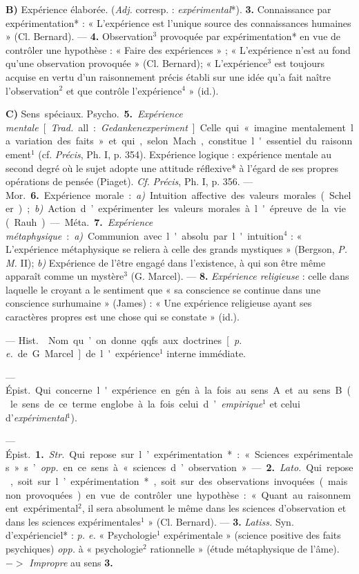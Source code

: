 \begin{itemize}[leftmargin=1cm, label=, itemsep=1pt]
{\bf B)}  Expérience élaborée. ({\it Adj.}
corresp. : {\it expérimental}*). {\bf 3.}  Connaissance par
expérimentation* : « L'expérience est l'unique source
des connaissances humaines » (Cl. Bernard). — {\bf 4.} 
Observation$^3$ provoquée par expérimentation* en vue de contrôler une
hypothèse : « Faire des expériences » ; « L’expérience n’est au fond
qu’une observation provoquée » (Cl. Bernard);
« L'expérience$^3$ est toujours acquise en vertu d'un
raisonnement précis établi sur une idée qu’a fait naître
l'observation$^2$ et que contrôle l’expérience$^4$ » (id.).

{\bf C)} \si{Sens spéciaux}.  \si{Psycho.}
 {\bf 5.} {\it Expérience mentale} [{\it Trad.} all. :
{\it Gedankenexperiment}]. Celle qui
« imagine mentalement la variation
des faits » et qui, selon Mach, constitue l'essentiel du raisonnement$^1$
(cf.  {\it Précis}, Ph. I, p. 354). Expérience logique : expérience mentale
au second degré où le sujet adopte une attitude réflexive* à l'égard de
ses propres opérations de pensée (Piaget). {\it Cf.}  {\it Précis}, Ph. I,
p. 356. — \si{Mor.} {\bf 6.} Expérience morale : {\it a)} Intuition
affective des valeurs morales (Scheler); {\it b)} Action d’expérimenter
les valeurs morales à l'épreuve de la vie (Rauh). — \si{Méta.} {\bf 7.}
{\it Expérience métaphysique} : {\it a)} Communion
avec l'absolu par l'intuition$^4$ : « L'expérience métaphysique se
reliera à celle des grands mystiques » (Bergson, {\it P. M.} II);
{\it b)} Expérience de l’être engagé dans l'existence, à
qui son être même apparaît comme un mystère$^3$ (G. Marcel).
— {\bf 8.} {\it Expérience religieuse} : celle dans laquelle
le croyant a le sentiment que « sa conscience se continue dans une
conscience surhumaine » (James) : « Une expérience religieuse ayant ses
caractères propres est une chose qui se constate » (id.).

 — \si{Hist.}  Nom
qu’on donne qqfs. aux doctrines
[{\it p. e.} de G. Marcel] de l'expérience$^1$
interne immédiate.

 — \si{Épist.}
Qui concerne l'expérience en gén. à
la fois au sens A et au sens B (le sens
de ce terme englobe à la fois celui
d’{\it empirique}$^1$ et celui d'{\it expérimental}$^1$).

 — \si{Épist.} {\bf 1.} {\it Str.} Qui
repose sur l’expérimentation* :
« Sciences expérimentales » s’{\it opp.}
en ce sens à « sciences d’observation ». — {\bf 2.} {\it Lato.} Qui repose,
soit sur l’expérimentation*, soit sur des observations invoquées (mais non
provoquées) en vue de contrôler une hypothèse : « Quant au raisonnement
expérimental$^2$, il sera absolument le même dans les sciences
d'observation et dans les sciences expérimentales$^1$ » (Cl. Bernard).
— {\bf 3.} {\it Latiss.} Syn. d'expérienciel* : {\it p. e.}
« Psychologie$^1$ expérimentale »
(science positive des faits psychiques) {\it opp.} à « psychologie$^2$ rationnelle » (étude métaphysique de l'âme).
$->$ {\it Impropre} au sens {\bf 3.}


\end{itemize}
